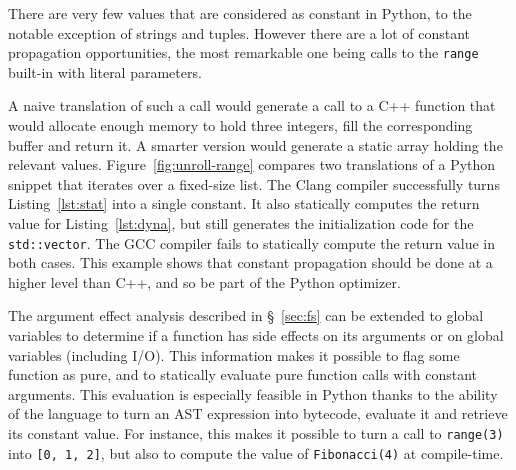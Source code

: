 \documentclass[10pt, preprint]{sigplanconf}
\begin{document}
There are very few values that are considered as constant in Python, to the
notable exception of strings and tuples. However there are a lot of constant
propagation opportunities, the most remarkable one being calls to the
\texttt{range} built-in with literal parameters.

A naive translation of such a call would generate a
call to a C++ function that would allocate enough memory to hold three integers,
fill the corresponding buffer and return it. A smarter version would generate a
static array holding the relevant values. Figure~\ref{fig:unroll-range}
compares two translations of a Python snippet that iterates over a fixed-size
list. The Clang compiler successfully turns Listing~\ref{lst:stat} into a
single constant. It also statically computes the return value for
Listing~\ref{lst:dyna}, but still generates the initialization code for the
\texttt{std::vector}. The GCC compiler fails to statically compute the return
value in both cases. This example shows that constant propagation should be
done at a higher level than C++, and so be part of the Python optimizer.

The argument effect analysis described in \S~\ref{sec:fs} can be extended to
global variables to determine if a function has side effects on its arguments or
on global variables (including I/O). This information makes it possible to flag
some function as pure, and to statically evaluate pure function calls with
constant arguments. This evaluation is especially feasible in Python thanks to
the ability of the language to turn an AST expression into bytecode, evaluate it
and retrieve its constant value. For instance, this makes it possible to turn a
call to \texttt{range(3)} into \texttt{[0, 1, 2]}, but also to compute the
value of \texttt{Fibonacci(4)} at compile-time.
\end{document}
